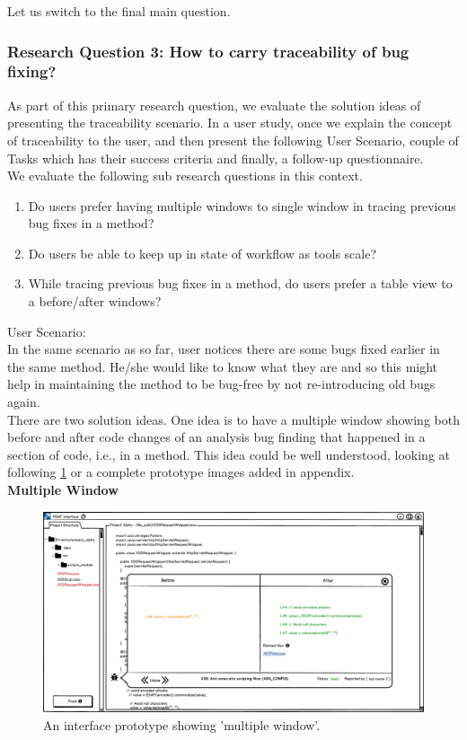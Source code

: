 Let us switch to the final main question. \\

\subsubsection{Research Question 3: How to carry traceability of bug fixing?}

As part of this primary research question, we evaluate the solution ideas of presenting the traceability scenario. In a user study, once we explain the concept of traceability to the user, and then present the following User Scenario, couple of Tasks which has their success criteria and finally, a follow-up questionnaire. \\

We evaluate the following sub research questions in this context. \\

\begin{enumerate}
\item Do users prefer having multiple windows to single window in tracing previous bug fixes in a method?
\item Do users be able to keep up in state of workflow as tools scale?
\item While tracing previous bug fixes in a method, do users prefer a table view to a before/after windows?
\end{enumerate}


User Scenario: \\

In the same scenario as so far, user notices there are some bugs fixed earlier in the same method. He/she would like to know what they are and so this might help in maintaining the method to be bug-free by not re-introducing old bugs again. \\

There are two solution ideas. One idea is to have a multiple window showing both before and after code changes of an analysis bug finding that happened in a section of code, i.e., in a method. This idea could be well understood, looking at following \ref{fig:S33_multiple} or a complete prototype images added in appendix. \\

\textbf{Multiple Window}
\begin{figure}[hbt!]
	\centering
	\includegraphics[width=\linewidth]{figures/solution_ideas_snaps/S33_multiple}
	\caption{An interface prototype showing 'multiple window'.}
	\label{fig:S33_multiple}
\end{figure}

